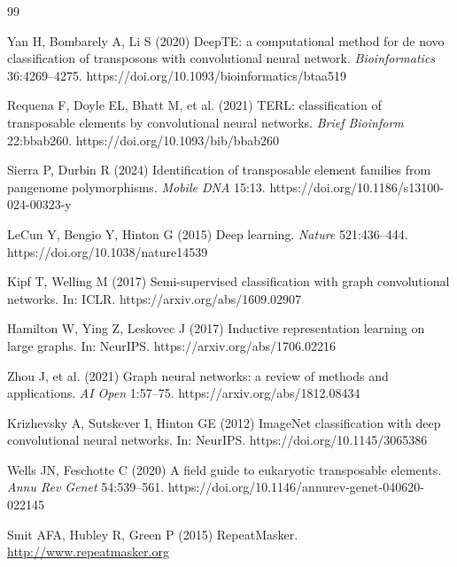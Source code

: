 \documentclass[12pt]{article}
\begin{document}
\begin{thebibliography}{99}

Yan H, Bombarely A, Li S (2020) DeepTE: a computational method for de novo classification of transposons with convolutional neural network. \textit{Bioinformatics} 36:4269--4275. https://doi.org/10.1093/bioinformatics/btaa519

Requena F, Doyle EL, Bhatt M, et al. (2021) TERL: classification of transposable elements by convolutional neural networks. \textit{Brief Bioinform} 22:bbab260. https://doi.org/10.1093/bib/bbab260

Sierra P, Durbin R (2024) Identification of transposable element families from pangenome polymorphisms. \textit{Mobile DNA} 15:13. https://doi.org/10.1186/s13100-024-00323-y

LeCun Y, Bengio Y, Hinton G (2015) Deep learning. \textit{Nature} 521:436--444. https://doi.org/10.1038/nature14539


Kipf T, Welling M (2017) Semi-supervised classification with graph convolutional networks. In: ICLR. https://arxiv.org/abs/1609.02907

Hamilton W, Ying Z, Leskovec J (2017) Inductive representation learning on large graphs. In: NeurIPS. https://arxiv.org/abs/1706.02216

Zhou J, et al. (2021) Graph neural networks: a review of methods and applications. \textit{AI Open} 1:57--75. https://arxiv.org/abs/1812.08434

Krizhevsky A, Sutskever I, Hinton GE (2012) ImageNet classification with deep convolutional neural networks. In: NeurIPS. https://doi.org/10.1145/3065386

Wells JN, Feschotte C (2020) A field guide to eukaryotic transposable elements. \textit{Annu Rev Genet} 54:539--561. https://doi.org/10.1146/annurev-genet-040620-022145

Smit AFA, Hubley R, Green P (2015) RepeatMasker. \url{http://www.repeatmasker.org}


\end{thebibliography}
\end{document}
